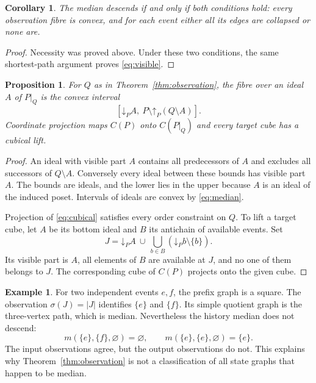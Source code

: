 \documentclass[11pt]{article}
\newtheorem{proposition}[theorem]{Proposition}
\newtheorem{corollary}[theorem]{Corollary}
\theoremstyle{definition}
\newtheorem{example}[theorem]{Example}
\numberwithin{equation}{section}
\begin{document}
\begin{corollary}\label{cor:tests}
The median descends if and only if both conditions hold:
every observation fibre is convex, and for each event either all
its edges are collapsed or none are.
\end{corollary}
\begin{proof}
Necessity was proved above. Under these two conditions, the same
shortest-path argument proves \eqref{eq:visible}.
\end{proof}

\begin{proposition}\label{prop:fibres}
For $Q$ as in Theorem~\ref{thm:observation}, the fibre over an ideal
$A$ of $P|_Q$ is the convex interval
\begin{equation}\label{eq:fibreinterval}
 [\mathord\downarrow_PA,\ P\setminus\mathord\uparrow_P(Q\setminus A)].
\end{equation}
Coordinate projection maps $C(P)$ onto $C(P|_Q)$ and every target
cube has a cubical lift.
\end{proposition}
\begin{proof}
An ideal with visible part $A$ contains all predecessors of $A$
and excludes all successors of $Q\setminus A$. Conversely every
ideal between these bounds has visible part $A$.
The bounds are ideals, and the lower lies in the upper because
$A$ is an ideal of the induced poset. Intervals of ideals are
convex by \eqref{eq:median}.

Projection of \eqref{eq:cubical} satisfies every order constraint
on $Q$. To lift a target cube, let $A$ be its bottom ideal and
$B$ its antichain of available events. Set
\[
 J=\mathord\downarrow_PA\ \cup\
       \bigcup_{b\in B}(\mathord\downarrow_Pb\setminus\{b\}).
\]
Its visible part is $A$, all elements of $B$ are available at $J$,
and no one of them belongs to $J$. The corresponding cube of
$C(P)$ projects onto the given cube.
\end{proof}

\begin{example}\label{ex:cardinality}
For two independent events $e,f$, the prefix graph is a square.
The observation $\sigma(J)=|J|$ identifies $\{e\}$ and $\{f\}$.
Its simple quotient graph is the three-vertex path, which is median.
Nevertheless the history median does not descend:
\[
 m(\{e\},\{f\},\varnothing)=\varnothing,\qquad
 m(\{e\},\{e\},\varnothing)=\{e\}.
\]
The input observations agree, but the output observations do not.
This explains why Theorem~\ref{thm:observation} is not a
classification of all state graphs that happen to be median.
\end{example}
\end{document}
